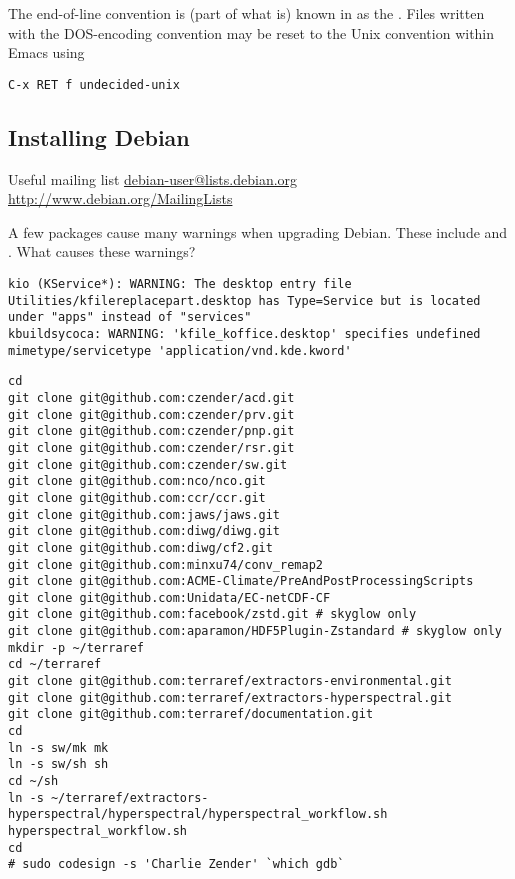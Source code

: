\documentclass[12pt,twoside]{article}
\begin{document}
The end-of-line convention is (part of what is) known in
 as the .
Files written with the DOS-encoding convention may be reset to the
Unix convention within Emacs using
\begin{verbatim}
C-x RET f undecided-unix
\end{verbatim}

\subsection{Installing Debian}\label{sxn:dbn_nst}
Useful mailing list \url{debian-user@lists.debian.org}
\url{http://www.debian.org/MailingLists}

A few packages cause many warnings when upgrading Debian. 
These include  and .
What causes these warnings?
\begin{verbatim}
kio (KService*): WARNING: The desktop entry file Utilities/kfilereplacepart.desktop has Type=Service but is located under "apps" instead of "services"
kbuildsycoca: WARNING: 'kfile_koffice.desktop' specifies undefined mimetype/servicetype 'application/vnd.kde.kword'
\end{verbatim}

\begin{verbatim}
cd
git clone git@github.com:czender/acd.git
git clone git@github.com:czender/prv.git
git clone git@github.com:czender/pnp.git
git clone git@github.com:czender/rsr.git
git clone git@github.com:czender/sw.git
git clone git@github.com:nco/nco.git
git clone git@github.com:ccr/ccr.git
git clone git@github.com:jaws/jaws.git
git clone git@github.com:diwg/diwg.git
git clone git@github.com:diwg/cf2.git
git clone git@github.com:minxu74/conv_remap2
git clone git@github.com:ACME-Climate/PreAndPostProcessingScripts
git clone git@github.com:Unidata/EC-netCDF-CF
git clone git@github.com:facebook/zstd.git # skyglow only
git clone git@github.com:aparamon/HDF5Plugin-Zstandard # skyglow only
mkdir -p ~/terraref
cd ~/terraref
git clone git@github.com:terraref/extractors-environmental.git
git clone git@github.com:terraref/extractors-hyperspectral.git
git clone git@github.com:terraref/documentation.git
cd
ln -s sw/mk mk
ln -s sw/sh sh
cd ~/sh
ln -s ~/terraref/extractors-hyperspectral/hyperspectral/hyperspectral_workflow.sh hyperspectral_workflow.sh
cd
# sudo codesign -s 'Charlie Zender' `which gdb`
\end{verbatim}
\end{document}
